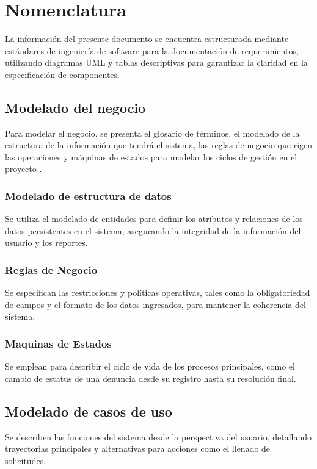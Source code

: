 \chapter{Nomenclatura}
\label{ch:nomenclatura}
    
    La información del presente documento se encuentra estructurada mediante estándares de ingeniería de software para la documentación de requerimientos, utilizando diagramas UML y tablas descriptivas para garantizar la claridad en la especificación de componentes.

    \section{Modelado del negocio}
    
        Para modelar el negocio, se presenta el glosario de términos, el modelado de la estructura de la información que tendrá el sistema, las reglas de negocio que rigen las operaciones y máquinas de estados para modelar los ciclos de gestión en el proyecto \varProyecto.

        \subsection{Modelado de estructura de datos}
        \label{sec:ModEstructuraDatos}
        Se utiliza el modelado de entidades para definir los atributos y relaciones de los datos persistentes en el sistema, asegurando la integridad de la información del usuario y los reportes.
        
        \subsection{Reglas de Negocio}
        \label{sec:ModReglasNegocio}
        Se especifican las restricciones y políticas operativas, tales como la obligatoriedad de campos y el formato de los datos ingresados, para mantener la coherencia del sistema.
        
        \subsection{Maquinas de Estados}
        \label{sec:ModMaquinas}
        Se emplean para describir el ciclo de vida de los procesos principales, como el cambio de estatus de una denuncia desde su registro hasta su resolución final.
    
    \clearpage
    \section{Modelado de casos de uso}
    Se describen las funciones del sistema desde la perspectiva del usuario, detallando trayectorias principales y alternativas para acciones como el llenado de solicitudes.

